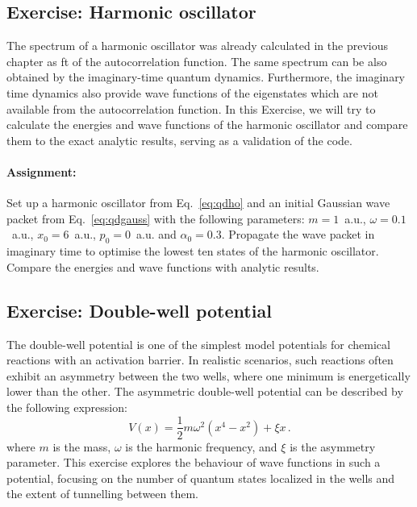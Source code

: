 \subsection*{Exercise: Harmonic oscillator}

The spectrum of a harmonic oscillator was already calculated in the previous chapter as \acrlong{ft} of the autocorrelation function. The same spectrum can be also obtained by the imaginary-time quantum dynamics. Furthermore, the imaginary time dynamics also provide wave functions of the eigenstates which are not available from the autocorrelation function. In this Exercise, we will try to calculate the energies and wave functions of the harmonic oscillator and compare them to the exact analytic results, serving as a validation of the code.

\paragraph{Assignment:} Set up a harmonic oscillator from Eq.~\eqref{eq:qdho} and an initial Gaussian wave packet from Eq.~\eqref{eq:qdgauss} with the following parameters: $m=1$~a.u., $\omega=0.1$~a.u., $x_0=6$~a.u., $p_0=0$~a.u. and $\alpha_0 = 0.3$. Propagate the wave packet in imaginary time to optimise the lowest ten states of the harmonic oscillator. Compare the energies and wave functions with analytic results.

\subsection*{Exercise: Double-well potential}

The double-well potential is one of the simplest model potentials for chemical reactions with an activation barrier. In realistic scenarios, such reactions often exhibit an asymmetry between the two wells, where one minimum is energetically lower than the other. The asymmetric double-well potential can be described by the following expression:
\begin{equation*}
    V(x) = \frac{1}{2}m\omega^2(x^4 - x^2) + \xi x \, .
\end{equation*}
where $m$ is the mass, $\omega$ is the harmonic frequency, and $\xi$ is the asymmetry parameter. This exercise explores the behaviour of wave functions in such a potential, focusing on the number of quantum states localized in the wells and the extent of tunnelling between them.

